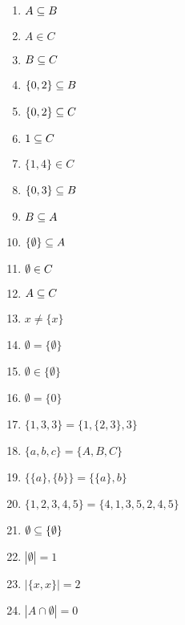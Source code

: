 \documentclass[12pt]{exam}
\begin{document}
    \begin{multicols}{2}
        \begin{enumerate}[label={\alph*})]
            \item $A \subseteq B$

            \item $A \in C$

            \item $B \subseteq C$

            \item $\{0,2\} \subseteq B$

            \item $\{0,2\} \subseteq C$

            \item $1 \subseteq C$

            \item $\{1,4\} \in C$

            \item $\{0,3\} \subseteq B$

            \item $B \subseteq A$

            \item $\{\emptyset\} \subseteq A$

            \item $\emptyset \in C$

            \item $A \subseteq C$

            \item $x \neq \{x\}$

            \item $\emptyset = \{\emptyset\}$

            \item $\emptyset \in \{\emptyset\}$

            \item $\emptyset = \{0\}$

            \item $\{1, 3, 3\} = \{1, \{2, 3\}, 3\}$

            \item $\{a, b, c\} = \{A, B, C\}$

            \item $\{\{a\}, \{b\}\} = \{\{a\}, b\}$

            \item $\{1, 2, 3, 4, 5\} = \{4, 1, 3, 5, 2, 4, 5\}$

            \item $\emptyset \subseteq \{\emptyset\}$

            \item $|\emptyset| = 1$

            \item $|\{x,x\}| = 2$

            \item $|A \cap \emptyset | = 0$
        \end{enumerate}
    \end{multicols}
\end{document}
